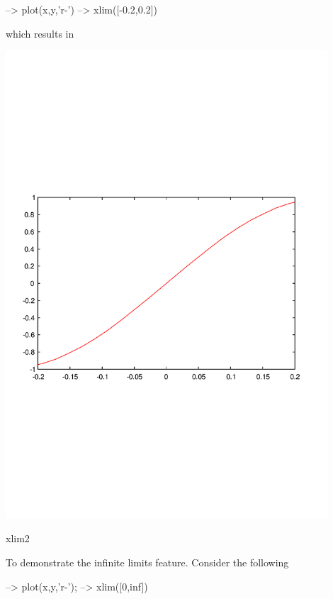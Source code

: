 \begin{DoxyVerbInclude}
--> plot(x,y,'r-')
--> xlim([-0.2,0.2])
\end{DoxyVerbInclude}


which results in  
\begin{DoxyImage}
\includegraphics[width=12cm]{xlim2}
\caption{xlim2}
\end{DoxyImage}
 To demonstrate the infinite limits feature. Consider the following


\begin{DoxyVerbInclude}
--> plot(x,y,'r-');
--> xlim([0,inf])
\end{DoxyVerbInclude}


